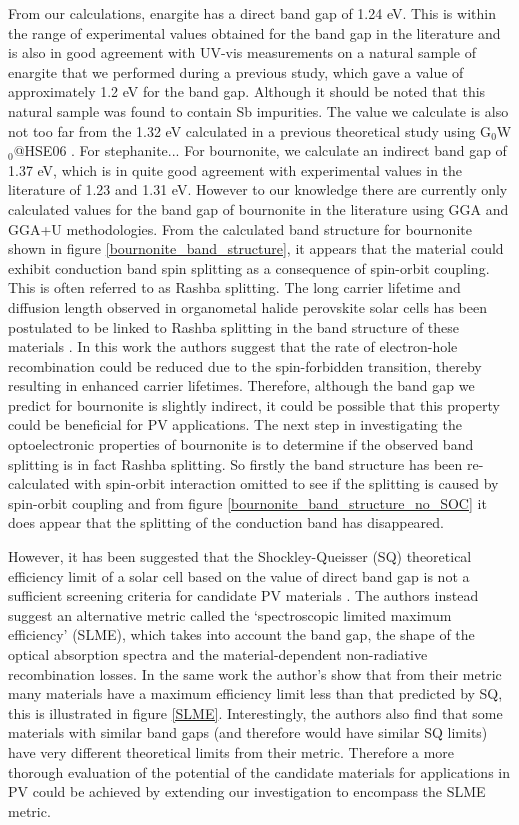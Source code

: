From our calculations, enargite has a direct band gap of 1.24 eV. This is within the range of experimental values obtained for the band gap in the literature and is also in good agreement with UV-vis measurements on a natural sample of enargite that we performed during a previous study, which gave a value of approximately 1.2 eV for the band gap. Although it should be noted that this natural sample was found to contain Sb impurities. The value we calculate is also not too far from the 1.32 eV calculated in a previous theoretical study using G$_0$W$_0$@HSE06 \cite{Zunger}.
For stephanite...
For bournonite, we calculate an indirect band gap of 1.37 eV, which is in quite good agreement with experimental values in the literature of 1.23 \cite{Dittrich1} and 1.31 \cite{bournonite} eV. However to our knowledge there are currently only calculated values for the band gap of bournonite in the literature using GGA and GGA+U methodologies. From the calculated band structure for bournonite shown in figure \ref{bournonite_band_structure}, it appears that the material could exhibit conduction band spin splitting as a consequence of spin-orbit coupling. This is often referred to as Rashba splitting. The long carrier lifetime and diffusion length observed in organometal halide perovskite solar cells has been postulated to be linked to Rashba splitting in the band structure of these materials \cite{Rashba_MAPI}. In this work the authors suggest that the rate of electron-hole recombination could be reduced due to the spin-forbidden transition, thereby resulting in enhanced carrier lifetimes.
Therefore, although the band gap we predict for bournonite is slightly indirect, it could be possible that this property could be beneficial for PV applications. The next step in investigating the optoelectronic properties of bournonite is to determine if the observed band splitting is in fact Rashba splitting. So firstly the band structure has been re-calculated with spin-orbit interaction omitted to see if the splitting is caused by spin-orbit coupling and from figure \ref{bournonite_band_structure_no_SOC} it does appear that the splitting of the conduction band has disappeared.

However, it has been suggested that the Shockley-Queisser (SQ) theoretical efficiency limit of a solar cell based on the value of direct band gap is not a sufficient screening criteria for candidate PV materials \cite{SLME}. The authors instead suggest an alternative metric called the `spectroscopic limited maximum efficiency' (SLME), which takes into account the band gap, the shape of the optical absorption spectra and the material-dependent non-radiative recombination losses. In the same work the author's show that from their metric many materials have a maximum efficiency limit less than that predicted by SQ, this is illustrated in figure \ref{SLME}. Interestingly, the authors also find that some materials with similar band gaps (and therefore would have similar SQ limits) have very different theoretical limits from their metric. Therefore a more thorough evaluation of the potential of the candidate materials for applications in PV could be achieved by extending our investigation to encompass the SLME metric.

